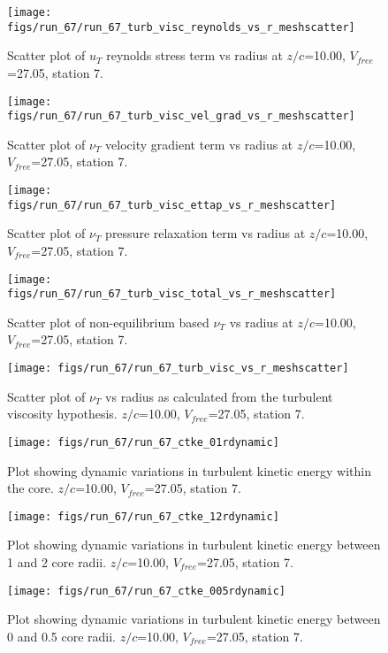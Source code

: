 \begin{figure}[H]
\centering
\texttt{[image: figs/run\_67/run\_67\_turb\_visc\_reynolds\_vs\_r\_meshscatter]}
\caption{Scatter plot of $
u_T$ reynolds stress term vs radius at $z/c$=10.00, $V_{free}$=27.05, station 7.}
\end{figure}


\begin{figure}[H]
\centering
\texttt{[image: figs/run\_67/run\_67\_turb\_visc\_vel\_grad\_vs\_r\_meshscatter]}
\caption{Scatter plot of $\nu_T$ velocity gradient term vs radius at $z/c$=10.00, $V_{free}$=27.05, station 7.}
\end{figure}


\begin{figure}[H]
\centering
\texttt{[image: figs/run\_67/run\_67\_turb\_visc\_ettap\_vs\_r\_meshscatter]}
\caption{Scatter plot of $\nu_T$ pressure relaxation term vs radius at $z/c$=10.00, $V_{free}$=27.05, station 7.}
\end{figure}


\begin{figure}[H]
\centering
\texttt{[image: figs/run\_67/run\_67\_turb\_visc\_total\_vs\_r\_meshscatter]}
\caption{Scatter plot of non-equilibrium based $\nu_T$ vs radius at $z/c$=10.00, $V_{free}$=27.05, station 7.}
\end{figure}


\begin{figure}[H]
\centering
\texttt{[image: figs/run\_67/run\_67\_turb\_visc\_vs\_r\_meshscatter]}
\caption{Scatter plot of $\nu_T$ vs radius as calculated from the turbulent viscosity hypothesis. $z/c$=10.00, $V_{free}$=27.05, station 7.}
\end{figure}


\begin{figure}[H]
\centering
\texttt{[image: figs/run\_67/run\_67\_ctke\_01rdynamic]}
\caption{Plot showing dynamic variations in turbulent kinetic energy within the core. $z/c$=10.00, $V_{free}$=27.05, station 7.}
\end{figure}


\begin{figure}[H]
\centering
\texttt{[image: figs/run\_67/run\_67\_ctke\_12rdynamic]}
\caption{Plot showing dynamic variations in turbulent kinetic energy between 1 and 2 core radii. $z/c$=10.00, $V_{free}$=27.05, station 7.}
\end{figure}


\begin{figure}[H]
\centering
\texttt{[image: figs/run\_67/run\_67\_ctke\_005rdynamic]}
\caption{Plot showing dynamic variations in turbulent kinetic energy between 0 and 0.5 core radii. $z/c$=10.00, $V_{free}$=27.05, station 7.}
\end{figure}


